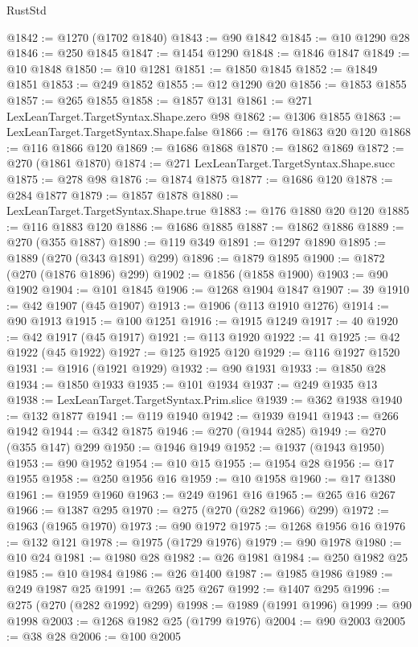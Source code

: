 \begin{lexlean}{RustStd}
\begin{coremodule}
@1842 := @1270 (@1702 @1840)
@1843 := @90 @1842
@1845 := @10 @1290 @28
@1846 := @250 @1845
@1847 := @1454 @1290
@1848 := @1846 @1847
@1849 := @10 @1848
@1850 := @10 @1281
@1851 := @1850 @1845
@1852 := @1849 @1851
@1853 := @249 @1852
@1855 := @12 @1290 @20
@1856 := @1853 @1855
@1857 := @265 @1855
@1858 := @1857 @131
@1861 := @271 LexLeanTarget.TargetSyntax.Shape.zero @98
@1862 := @1306 @1855
@1863 := LexLeanTarget.TargetSyntax.Shape.false
@1866 := @176 @1863 @20 @120
@1868 := @116 @1866 @120
@1869 := @1686 @1868
@1870 := @1862 @1869
@1872 := @270 (@1861 @1870)
@1874 := @271 LexLeanTarget.TargetSyntax.Shape.succ
@1875 := @278 @98
@1876 := @1874 @1875
@1877 := @1686 @120
@1878 := @284 @1877
@1879 := @1857 @1878
@1880 := LexLeanTarget.TargetSyntax.Shape.true
@1883 := @176 @1880 @20 @120
@1885 := @116 @1883 @120
@1886 := @1686 @1885
@1887 := @1862 @1886
@1889 := @270 (@355 @1887)
@1890 := @119 @349
@1891 := @1297 @1890
@1895 := @1889 (@270 (@343 @1891) @299)
@1896 := @1879 @1895
@1900 := @1872 (@270 (@1876 @1896) @299)
@1902 := @1856 (@1858 @1900)
@1903 := @90 @1902
@1904 := @101 @1845
@1906 := @1268 @1904 @1847
@1907 := 39
@1910 := @42 @1907 (@45 @1907)
@1913 := @1906 (@113 @1910 @1276)
@1914 := @90 @1913
@1915 := @100 @1251
@1916 := @1915 @1249
@1917 := 40
@1920 := @42 @1917 (@45 @1917)
@1921 := @113 @1920
@1922 := 41
@1925 := @42 @1922 (@45 @1922)
@1927 := @125 @1925 @120
@1929 := @116 @1927 @1520
@1931 := @1916 (@1921 @1929)
@1932 := @90 @1931
@1933 := @1850 @28
@1934 := @1850 @1933
@1935 := @101 @1934
@1937 := @249 @1935 @13
@1938 := LexLeanTarget.TargetSyntax.Prim.slice
@1939 := @362 @1938
@1940 := @132 @1877
@1941 := @119 @1940
@1942 := @1939 @1941
@1943 := @266 @1942
@1944 := @342 @1875
@1946 := @270 (@1944 @285)
@1949 := @270 (@355 @147) @299
@1950 := @1946 @1949
@1952 := @1937 (@1943 @1950)
@1953 := @90 @1952
@1954 := @10 @15
@1955 := @1954 @28
@1956 := @17 @1955
@1958 := @250 @1956 @16
@1959 := @10 @1958
@1960 := @17 @1380
@1961 := @1959 @1960
@1963 := @249 @1961 @16
@1965 := @265 @16 @267
@1966 := @1387 @295
@1970 := @275 (@270 (@282 @1966) @299)
@1972 := @1963 (@1965 @1970)
@1973 := @90 @1972
@1975 := @1268 @1956 @16
@1976 := @132 @121
@1978 := @1975 (@1729 @1976)
@1979 := @90 @1978
@1980 := @10 @24
@1981 := @1980 @28
@1982 := @26 @1981
@1984 := @250 @1982 @25
@1985 := @10 @1984
@1986 := @26 @1400
@1987 := @1985 @1986
@1989 := @249 @1987 @25
@1991 := @265 @25 @267
@1992 := @1407 @295
@1996 := @275 (@270 (@282 @1992) @299)
@1998 := @1989 (@1991 @1996)
@1999 := @90 @1998
@2003 := @1268 @1982 @25 (@1799 @1976)
@2004 := @90 @2003
@2005 := @38 @28
@2006 := @100 @2005

\end{coremodule}
\end{lexlean}
